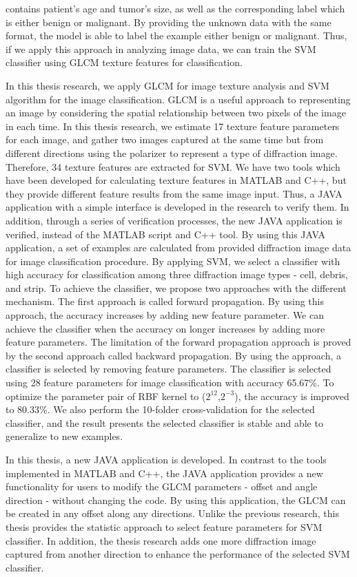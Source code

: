 contains patient's age and tumor's size, as well as the corresponding label which is either benign or malignant. By providing the unknown data with the same format, the model is able to label the example either benign or malignant. Thus, if we apply this approach in analyzing image data, we can train the SVM classifier using GLCM texture features for classification. \par 
In this thesis research, we apply GLCM for image texture analysis and SVM algorithm for the image classification. GLCM is a useful approach to representing an image by considering the spatial relationship between two pixels of the image in each time. In this thesis research, we estimate 17 texture feature parameters\cite{Haralick} for each image, and gather two images captured at the same time but from different directions using the polarizer to represent a type of diffraction image. Therefore, 34 texture features are extracted for SVM. We have two tools which have been developed for calculating texture features in MATLAB and C++, but they provide different feature results from the same image input. Thus, a JAVA application  with a simple interface is developed in the research to verify them. In addition, through a series of verification processes, the new JAVA application is verified, instead of the MATLAB script and C++ tool. By using this JAVA application, a set of examples are calculated from provided diffraction image data for image classification procedure. By applying SVM, we select a classifier with high accuracy for classification among three diffraction image types - cell, debris, and strip. To achieve the classifier, we propose two approaches with the different mechanism. The first approach is called forward propagation. By using this approach, the accuracy increases by adding new feature parameter. We can achieve the classifier when the accuracy on longer increases by adding more feature parameters. The limitation of the forward propagation approach is proved by the second approach called backward propagation. By using the approach, a classifier is selected by removing feature parameters. The classifier is selected using 28 feature parameters for image classification with accuracy 65.67\%. To optimize the parameter pair of RBF kernel to ($2^{12}$,$2^{-3}$), the accuracy is improved to 80.33\%. We also perform the 10-folder cross-validation for the selected classifier, and the result presents the selected classifier is stable and able to generalize to new examples.\par
In this thesis, a new JAVA application is developed. In contrast to the tools implemented in MATLAB and C++, the JAVA application provides a new functionality for users to modify the GLCM parameters - offset and angle direction - without changing the code. By using this application, the GLCM can be created in any offset along any directions. Unlike the previous research\cite{Thati}, this thesis provides the statistic approach to select feature parameters for SVM classifier. In addition, the thesis research adds one more diffraction image captured from another direction to enhance the performance of the selected SVM classifier. \par
